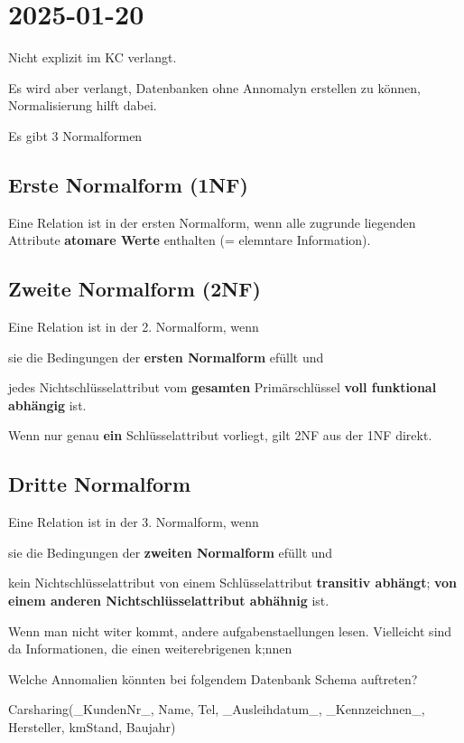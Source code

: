 \section{2025-01-20}

\startframedtipp
Nicht explizit im KC verlangt.

Es wird aber verlangt, Datenbanken ohne Annomalyn erstellen zu können, Normalisierung hilft dabei.
\stopframedtipp

\startitemize[packed]
\item Es gibt 3 Normalformen
\stopitemize

\subsection{Erste Normalform (1NF)}

Eine Relation ist in der ersten Normalform, wenn alle zugrunde liegenden Attribute {\bf atomare Werte} enthalten (= elemntare Information).

\subsection{Zweite Normalform (2NF)}

Eine Relation ist in der 2. Normalform, wenn

\startitemize[packed]
\item sie die Bedingungen der {\bf ersten Normalform} efüllt und
\item jedes Nichtschlüsselattribut vom {\bf gesamten} Primärschlüssel {\bf voll funktional abhängig} ist.
\stopitemize

\startframedtipp
Wenn nur genau {\bf ein} Schlüsselattribut vorliegt, gilt 2NF aus der 1NF direkt.
\stopframedtipp

\subsection{Dritte Normalform}

Eine Relation ist in der 3. Normalform, wenn

\startitemize[packed]
\item sie die Bedingungen der {\bf zweiten Normalform} efüllt und
\item kein Nichtschlüsselattribut von einem Schlüsselattribut {\bf transitiv abhängt}; {\bf von einem anderen Nichtschlüsselattribut abhähnig} ist.
\stopitemize


\startframedtipp
	Wenn man nicht witer kommt, andere aufgabenstaellungen lesen. Vielleicht sind da Informationen, die einen weiterebrigenen k;nnen
\stopframedtipp

Welche Annomalien könnten bei folgendem Datenbank Schema auftreten?

Carsharing(_KundenNr_, Name, Tel, _Ausleihdatum_, _Kennzeichnen_, Hersteller, kmStand, Baujahr)
